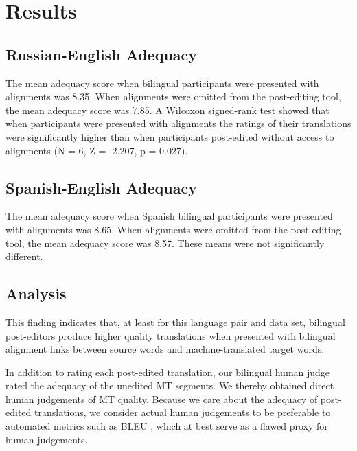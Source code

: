 \section{Results}
\label{sec:results}

\subsection{Russian-English Adequacy}


The mean adequacy score when bilingual participants were presented with alignments was 8.35.
%
When alignments were omitted from the post-editing tool, the mean adequacy score was 7.85.  
%
A Wilcoxon signed-rank test \citep{1945_Wilcoxon} showed that when participants were presented with alignments the ratings of their translations were significantly higher than when participants post-edited without access to alignments (N = 6, Z = -2.207, p = 0.027).




\subsection{Spanish-English Adequacy}

The mean adequacy score when Spanish bilingual participants were presented with alignments was 8.65. When alignments were omitted from the post-editing tool, the mean adequacy score was 8.57. These means were not significantly different.

\subsection{Analysis}

This finding indicates that, at least for this language pair and data set, bilingual post-editors produce higher quality translations when presented with bilingual alignment links between source words and machine-translated target words.

In addition to rating each post-edited translation, our bilingual human judge rated the adequacy of the unedited MT segments.
%
We thereby obtained direct human judgements of MT quality.%
%
Because we care about the adequacy of post-edited translations, we consider actual human judgements to be preferable to automated metrics such as BLEU \citep{2002_ACL_Papineni_etal}, which at best serve as a flawed proxy for human judgements.


